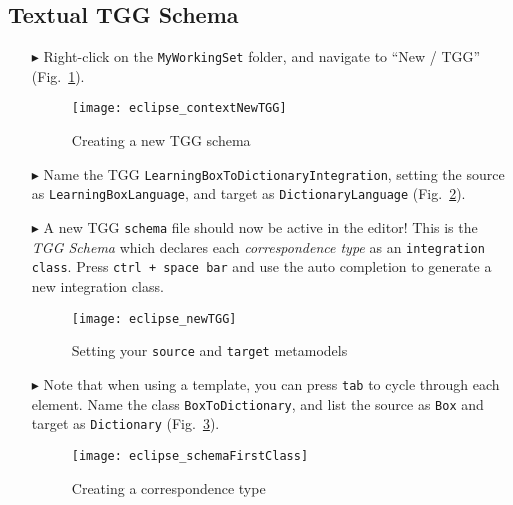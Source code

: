 \newpage
\hypertarget{schema tex}{}
\subsection{Textual TGG Schema}
\texHeader

\begin{itemize}

\item[$\blacktriangleright$] Right-click on the \texttt{MyWorkingSet} folder, and navigate to ``New / TGG'' (Fig.~\ref{eclipse:contextTGG}).

\vspace{0.5cm}

\begin{figure}[htbp]
\begin{center}
  \texttt{[image: eclipse\_contextNewTGG]}
  \caption{Creating a new TGG schema}
  \label{eclipse:contextTGG}
\end{center}
\end{figure}

\item[$\blacktriangleright$] Name the TGG \texttt{LearningBoxToDictionaryIntegration}, setting the source as \texttt{LearningBoxLanguage}, and target as
\texttt{DictionaryLanguage} (Fig.~\ref{eclipse:newTGG}).

\item[$\blacktriangleright$] A new TGG \texttt{schema} file should now be active in the editor! This is the \emph{TGG Schema} which declares each
\emph{correspondence type} as an \texttt{integration class}. Press \texttt{ctrl + space bar} and use the auto completion to generate a new integration class.

\newpage

\begin{figure}[htbp]
\begin{center}
  \texttt{[image: eclipse\_newTGG]}
  \caption{Setting your \texttt{source} and \texttt{target} metamodels}
  \label{eclipse:newTGG}
\end{center}
\end{figure}

\item[$\blacktriangleright$] Note that when using a template, you can press \texttt{tab} to cycle through each element. Name the class
\texttt{BoxToDictionary}, and list the source as \texttt{Box} and target as \texttt{Dictionary} (Fig.~\ref{eclipse:firstCorrType}). 

\begin{figure}[htbp]
\begin{center}
  \texttt{[image: eclipse\_schemaFirstClass]}
  \caption{Creating a correspondence type}
  \label{eclipse:firstCorrType}
\end{center}
\end{figure}


\end{itemize}
